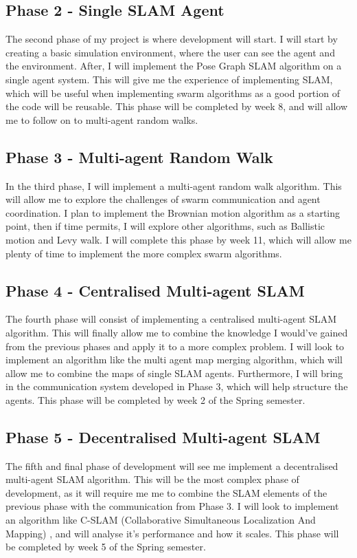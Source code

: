 \documentclass[12pt]{article}
\begin{document}
\subsection{Phase 2 - Single SLAM Agent}
The second phase of my project is where development will start. I will start by creating a basic simulation environment, where
the user can see the agent and the environment. After, I will implement the Pose Graph SLAM algorithm on a single agent system.
This will give me the experience of implementing SLAM, which will be useful when implementing swarm algorithms as a good portion
of the code will be reusable. This phase will be completed by week 8, and will allow me to follow on to multi-agent random walks.
\subsection{Phase 3 - Multi-agent Random Walk}
In the third phase, I will implement a multi-agent random walk algorithm. This will allow me to explore the challenges of swarm
communication and agent coordination. I plan to implement the Brownian motion algorithm as a starting point, then if time permits,
I will explore other algorithms, such as Ballistic motion and Levy walk. I will complete this phase by week 11, which will allow me
plenty of time to implement the more complex swarm algorithms.
\subsection{Phase 4 - Centralised Multi-agent SLAM}
The fourth phase will consist of implementing a centralised multi-agent SLAM algorithm. This will finally allow me to combine
the knowledge I would've gained from the previous phases and apply it to a more complex problem. I will look to implement an
algorithm like the multi agent map merging algorithm, which will allow me to combine the maps of single SLAM agents. Furthermore,
I will bring in the communication system developed in Phase 3, which will help structure the agents. This phase will be completed by
week 2 of the Spring semester.
\subsection{Phase 5 - Decentralised Multi-agent SLAM}
The fifth and final phase of development will see me implement a decentralised multi-agent SLAM algorithm. This will be the most
complex phase of development, as it will require me me to combine the SLAM elements of the previous phase with the communication
from Phase 3. I will look to implement an algorithm like C-SLAM (Collaborative Simultaneous Localization And Mapping) \cite{C-SLAM}, and will analyse it's performance and how it scales. This phase
will be completed by week 5 of the Spring semester.
\end{document}
